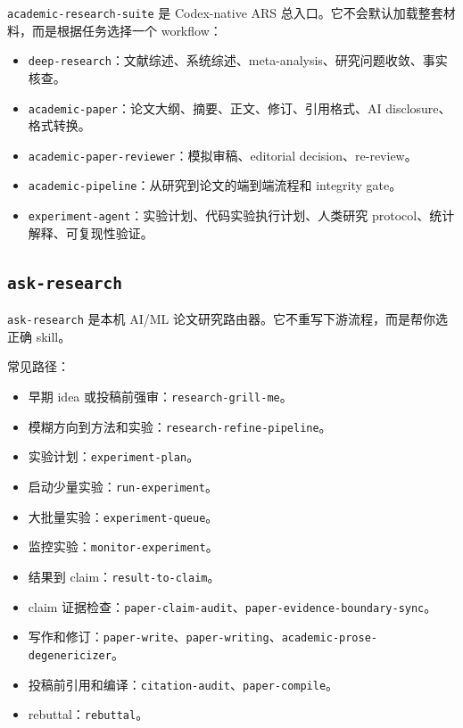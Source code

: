 \documentclass[UTF8,a4paper,11pt,fontset=none]{ctexart}
\newcommand{\skill}[1]{\texttt{#1}}
\begin{document}
\skill{academic-research-suite} 是 Codex-native ARS 总入口。它不会默认加载整套材料，而是根据任务选择一个 workflow：

\begin{itemize}
  \item \skill{deep-research}：文献综述、系统综述、meta-analysis、研究问题收敛、事实核查。
  \item \skill{academic-paper}：论文大纲、摘要、正文、修订、引用格式、AI disclosure、格式转换。
  \item \skill{academic-paper-reviewer}：模拟审稿、editorial decision、re-review。
  \item \skill{academic-pipeline}：从研究到论文的端到端流程和 integrity gate。
  \item \skill{experiment-agent}：实验计划、代码实验执行计划、人类研究 protocol、统计解释、可复现性验证。
\end{itemize}

\subsection{\skill{ask-research}}

\skill{ask-research} 是本机 AI/ML 论文研究路由器。它不重写下游流程，而是帮你选正确 skill。

常见路径：

\begin{itemize}
  \item 早期 idea 或投稿前强审：\skill{research-grill-me}。
  \item 模糊方向到方法和实验：\skill{research-refine-pipeline}。
  \item 实验计划：\skill{experiment-plan}。
  \item 启动少量实验：\skill{run-experiment}。
  \item 大批量实验：\skill{experiment-queue}。
  \item 监控实验：\skill{monitor-experiment}。
  \item 结果到 claim：\skill{result-to-claim}。
  \item claim 证据检查：\skill{paper-claim-audit}、\skill{paper-evidence-boundary-sync}。
  \item 写作和修订：\skill{paper-write}、\skill{paper-writing}、\skill{academic-prose-degenericizer}。
  \item 投稿前引用和编译：\skill{citation-audit}、\skill{paper-compile}。
  \item rebuttal：\skill{rebuttal}。
\end{itemize}
\end{document}
